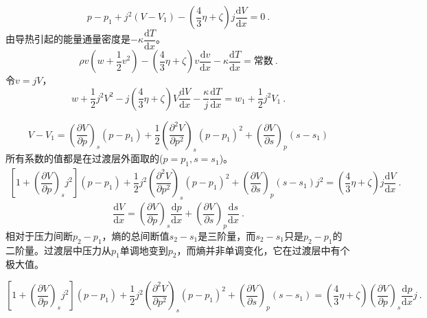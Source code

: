 \documentclass[12pt,a4paper]{article}
\newcommand{\dif}{\mathrm{d}}
\begin{document}
\begin{equation*}
p - p_1 + j^2 (V -V_1) - \left(\dfrac{4}{3} \eta +\zeta \right) j \dfrac{\dif V}{\dif x} = 0 ~.
\end{equation*}
由导热引起的能量通量密度是$-\kappa \dfrac{\dif T}{\dif x}$。
\begin{equation*}
\rho v \left(w + \dfrac{1}{2} v^2 \right) -\left(\dfrac{4}{3} \eta +\zeta \right) v \dfrac{\dif v}{\dif x} -\kappa \dfrac{\dif T}{\dif x} = \text{常数} ~.
\end{equation*}
令$v = j V$，
\begin{equation}
w +\dfrac{1}{2} j^2 V^2 - j \left(\dfrac{4}{3} \eta +\zeta \right) V\dfrac{\dif V}{\dif x} - \dfrac{\kappa}{j} \dfrac{\dif T}{\dif x} = w_1 +\dfrac{1}{2} j^2 V_1 ~.
\end{equation}

\begin{equation*}
V -V_1 =  \left(\dfrac{\partial V}{\partial p}\right)_s (p-p_1) +\dfrac{1}{2}  \left(\dfrac{\partial^2 V}{\partial p^2}\right)_s (p-p_1)^2 + \left(\dfrac{\partial V}{\partial s}\right)_p (s-s_1)
\end{equation*}
所有系数的值都是在过渡层外面取的($p = p_1, s = s_1$)。
\begin{align}
\left[1 +\left(\dfrac{\partial V}{\partial p}\right)_s j^2 \right] (p-p_1) +\dfrac{1}{2} j^2 \left(\dfrac{\partial^2 V}{\partial p^2}\right)_s (p-p_1)^2 + \left(\dfrac{\partial V}{\partial s}\right)_p (s-s_1) j^2 = \left(\dfrac{4}{3} \eta +\zeta \right) j \dfrac{\dif V}{\dif x} ~.
\end{align}
\begin{equation*}
\dfrac{\dif V}{\dif x} = \left(\dfrac{\partial V}{\partial p}\right)_s \dfrac{\dif p}{\dif x} + \left(\dfrac{\partial V}{\partial s}\right)_p \dfrac{\dif s}{\dif x} ~.
\end{equation*}
相对于压力间断$p_2 - p_1$，熵的总间断值$s_2 -s_1$是三阶量，而$s_2 -s_1$只是$p_2 - p_1$的二阶量。过渡层中压力从$p_1$单调地变到$p_2$，而熵并非单调变化，它在过渡层中有个极大值。

\begin{equation}
\left[1 +\left(\dfrac{\partial V}{\partial p}\right)_s j^2 \right] (p-p_1) + \dfrac{1}{2} j^2 \left(\dfrac{\partial^2 V}{\partial p^2}\right)_s (p-p_1)^2 + \left(\dfrac{\partial V}{\partial s}\right)_p (s-s_1) =  \left(\dfrac{4}{3} \eta +\zeta \right) \left(\dfrac{\partial V}{\partial p}\right)_s \dfrac{\dif p}{\dif x} j ~.
\end{equation}
\end{document}
